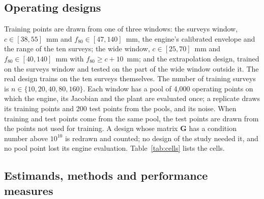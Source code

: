 \subsection{Operating designs}

Training points are drawn from one of three windows: the surveys window, $c\in[38,55]$~mm and $f_{80}\in[47,140]$~mm, the
engine's calibrated envelope and the range of the ten surveys; the wide window, $c\in[25,70]$~mm and $f_{80}\in[40,140]$~mm with
$f_{80}\ge c+10$~mm; and the extrapolation design, trained on the surveys window and tested on the part of the wide window
outside it. The real design trains on the ten surveys themselves. The number of training surveys is $n\in\{10,20,40,80,160\}$.
Each window has a pool of 4,000 operating points on which the engine, its Jacobian and the plant are evaluated once; a
replicate draws its training points and 200 test points from the pools, and its noise. When training and test points come from
the same pool, the test points are drawn from the points not used for training. A design whose matrix $\mathbf G$ has a
condition number above $10^{10}$ is redrawn and counted; no design of the study needed it, and no pool point lost its engine
evaluation. Table~\ref{tab:cells} lists the cells.

\begin{table}[!t]
\caption{The cells of the study: each virtual plant on each design, with the number of training surveys, the predictors run
and the number of replicates; every cell uses 200 test points per replicate.}
\label{tab:cells}
\centering\footnotesize
\resizebox{\columnwidth}{!}{}
\end{table}

\subsection{Estimands, methods and performance measures}

